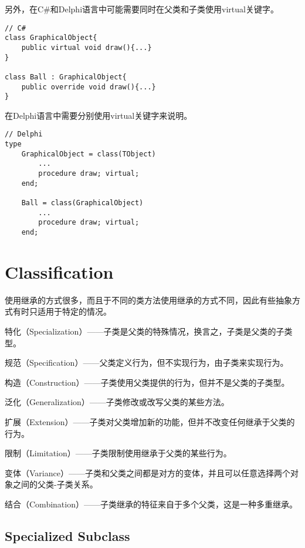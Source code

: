另外，在C\#和Delphi语言中可能需要同时在父类和子类使用virtual关键字。



\begin{lstlisting}[language={[Sharp]C}]
// C#
class GraphicalObject{
	public virtual void draw(){...}
}

class Ball : GraphicalObject{
	public override void draw(){...}
}
\end{lstlisting}

在Delphi语言中需要分别使用virtual关键字来说明。



\begin{lstlisting}[language=Delphi]
// Delphi
type
	GraphicalObject = class(TObject)
		...
		procedure draw; virtual;
	end;

	Ball = class(GraphicalObject)
		...
		procedure draw; virtual;
	end;
\end{lstlisting}


\chapter{Classification}

使用继承的方式很多，而且于不同的类方法使用继承的方式不同，因此有些抽象方式有时只适用于特定的情况。

\begin{compactitem}
\item 特化（Specialization）——子类是父类的特殊情况，换言之，子类是父类的子类型。
\item 规范（Specification）——父类定义行为，但不实现行为，由子类来实现行为。
\item 构造（Construction）——子类使用父类提供的行为，但并不是父类的子类型。
\item 泛化（Generalization）——子类修改或改写父类的某些方法。
\item 扩展（Extension）——子类对父类增加新的功能，但并不改变任何继承于父类的行为。
\item 限制（Limitation）——子类限制使用继承于父类的某些行为。
\item 变体（Variance）——子类和父类之间都是对方的变体，并且可以任意选择两个对象之间的父类-子类关系。
\item 结合（Combination）——子类继承的特征来自于多个父类，这是一种多重继承。
\end{compactitem}


\section{Specialized Subclass}

